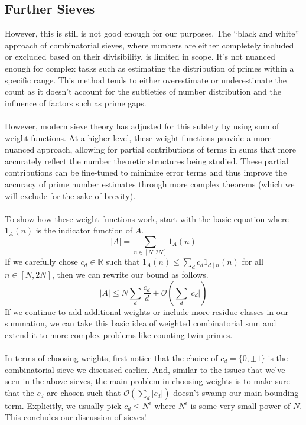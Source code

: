 \documentclass[8pt]{extarticle}
\begin{document}
\subsection{Further Sieves} 
However, this is still is not good enough for our purposes. The ``black and white'' approach of combinatorial sieves, where numbers are either completely included or excluded based on their divisibility, is limited in scope. 
It's not nuanced enough for complex tasks such as estimating the distribution of primes within a specific range. 
This method tends to either overestimate or underestimate the count as it doesn't account for the subtleties of number distribution and the influence of factors such as prime gaps. \\
\\
However, modern sieve theory has adjusted for this sublety by using sum of weight functions. 
At a higher level, these weight functions provide a more nuanced approach, allowing for partial contributions of terms in sums that more accurately reflect the number theoretic structures being studied. 
These partial contributions can be fine-tuned to minimize error terms and thus improve the accuracy of prime number estimates through more complex theorems (which we will exclude for the sake of brevity). \\
\\
To show how these weight functions work, start with the basic equation where $1_A(n)$ is the indicator function of $A$.
$$
|A| = \sum_{n \in [N,2N]} 1_A(n)
$$
If we carefully chose $c_d \in \mathbb{R}$ such that $1_A(n) \leq \sum_{d} c_d 1_{d \mid n} (n)$ for all $n \in [N,2N]$, then we can rewrite our bound as follows.
$$
|A| \leq N \sum_{d} \frac{c_d}{d} + \mathcal{O}\left(\sum_{d} |c_d| \right)
$$
If we continue to add additional weights or include more residue classes in our summation, we can take this basic idea of weighted combinatorial sum and extend it to more complex problems like counting twin primes.\\
\\
In terms of choosing weights, first notice that the choice of $c_d = \{0,\pm 1\}$ is the combinatorial sieve we discussed earlier. 
And, similar to the issues that we've seen in the above sieves, the main problem in choosing weights is to make sure that the $c_d$ are chosen such that $\mathcal{O}\left(\sum_{d} |c_d|\right)$ doesn't swamp our main bounding term. Explicitly, we usually pick $c_d \leq N^\epsilon$ where $N^\epsilon$ is some very small power of $N$. This concludes our discussion of sieves!
\end{document}
